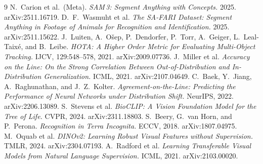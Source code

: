 \documentclass[11pt]{article}
\begin{document}
\begin{thebibliography}{9}
 N.~Carion et al.\ (Meta). \emph{SAM\,3: Segment Anything with Concepts.} 2025. arXiv:2511.16719.
 D.~F.~Wasmuht et al. \emph{The SA-FARI Dataset: Segment Anything in Footage of Animals for Recognition and Identification.} 2025. arXiv:2511.15622.
 J.~Luiten, A.~O\v{s}ep, P.~Dendorfer, P.~Torr, A.~Geiger, L.~Leal-Taix\'e, and B.~Leibe. \emph{HOTA: A Higher Order Metric for Evaluating Multi-Object Tracking.} IJCV, 129:548--578, 2021. arXiv:2009.07736.
 J.~Miller et al. \emph{Accuracy on the Line: On the Strong Correlation Between Out-of-Distribution and In-Distribution Generalization.} ICML, 2021. arXiv:2107.04649.
 C.~Baek, Y.~Jiang, A.~Raghunathan, and J.~Z.~Kolter. \emph{Agreement-on-the-Line: Predicting the Performance of Neural Networks under Distribution Shift.} NeurIPS, 2022. arXiv:2206.13089.
 S.~Stevens et al. \emph{BioCLIP: A Vision Foundation Model for the Tree of Life.} CVPR, 2024. arXiv:2311.18803.
 S.~Beery, G.~van Horn, and P.~Perona. \emph{Recognition in Terra Incognita.} ECCV, 2018. arXiv:1807.04975.
 M.~Oquab et al. \emph{DINOv2: Learning Robust Visual Features without Supervision.} TMLR, 2024. arXiv:2304.07193.
 A.~Radford et al. \emph{Learning Transferable Visual Models from Natural Language Supervision.} ICML, 2021. arXiv:2103.00020.
\end{thebibliography}
\end{document}
